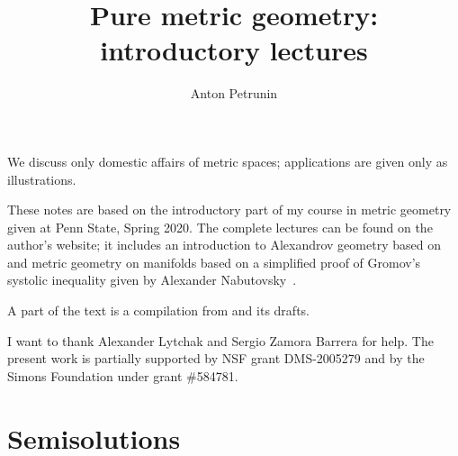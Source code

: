 \documentclass[twoside]{book}
\begin{document}

 
\title{Pure metric geometry:\\
introductory lectures}
\author{Anton Petrunin}
\date{}
\maketitle

We discuss only domestic affairs of metric spaces;
applications are given only as illustrations.

These notes are based on the introductory part of my course in metric geometry given at Penn State, Spring 2020.
The complete lectures can be found on the author's website;
it includes an introduction to Alexandrov geometry based on \cite{alexander-kapovitch-petrunin-2019} and metric geometry on manifolds \cite{petrunin2020mnfld} based on a simplified proof of Gromov's systolic inequality given by Alexander Nabutovsky~\cite{nabutovsky}.

A part of the text is a compilation from \cite{alexander-kapovitch-petrunin-2019, alexander-kapovitch-petrunin-2025, petrunin-yashinski, petrunin-2009, petrunin-zamorabarrera} and its drafts.

I want to thank Alexander Lytchak and Sergio Zamora Barrera for help.
The present work is partially supported by NSF grant DMS-2005279
and by the Simons Foundation under grant \#584781.

\thispagestyle{empty}
\tableofcontents
\thispagestyle{empty}








\appendix
\chapter{Semisolutions}






{\small\sloppy


\def\emph{\textit}

\printbibliography[heading=bibintoc]
\fussy
}
\end{document}
